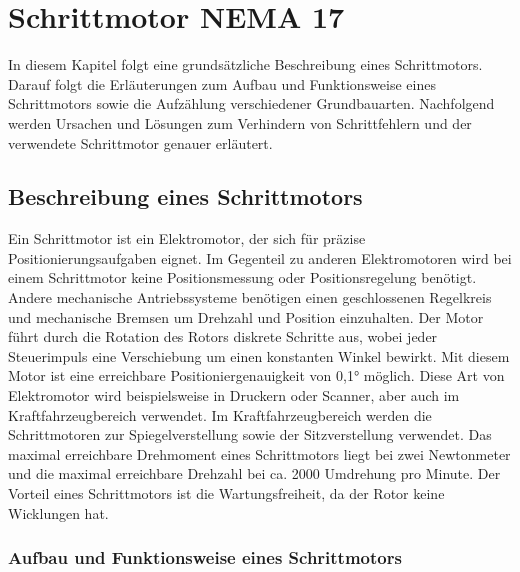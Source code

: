 %
%
%

\chapter{Schrittmotor NEMA 17}

In diesem Kapitel folgt eine grundsätzliche Beschreibung eines Schrittmotors. Darauf folgt die Erläuterungen zum Aufbau und Funktionsweise eines Schrittmotors sowie die Aufzählung verschiedener Grundbauarten. Nachfolgend werden Ursachen und Lösungen zum Verhindern von Schrittfehlern und der verwendete Schrittmotor genauer erläutert.

\section{Beschreibung eines Schrittmotors}

Ein Schrittmotor ist ein Elektromotor, der sich für präzise Positionierungsaufgaben eignet. Im Gegenteil zu anderen Elektromotoren wird bei einem Schrittmotor keine Positionsmessung oder Positionsregelung benötigt. Andere mechanische Antriebssysteme benötigen einen geschlossenen Regelkreis und mechanische Bremsen um Drehzahl und Position einzuhalten. Der Motor führt durch die Rotation des Rotors diskrete Schritte aus, wobei jeder Steuerimpuls eine Verschiebung um einen konstanten Winkel bewirkt. Mit diesem Motor ist eine erreichbare Positioniergenauigkeit von 0,1° möglich. Diese Art von Elektromotor wird beispielsweise in Druckern oder Scanner, aber auch im Kraftfahrzeugbereich verwendet. Im Kraftfahrzeugbereich werden die Schrittmotoren zur Spiegelverstellung sowie der Sitzverstellung verwendet. Das maximal erreichbare Drehmoment eines Schrittmotors liegt bei zwei Newtonmeter und die maximal erreichbare Drehzahl bei ca. 2000 Umdrehung pro Minute. Der Vorteil eines Schrittmotors ist die Wartungsfreiheit, da der Rotor keine Wicklungen hat. \cite{Babiel.2023}\cite{Hagl.2021}\cite{Bernstein.2018}\cite{Schroder.2021}

\subsection{Aufbau und Funktionsweise eines Schrittmotors}

